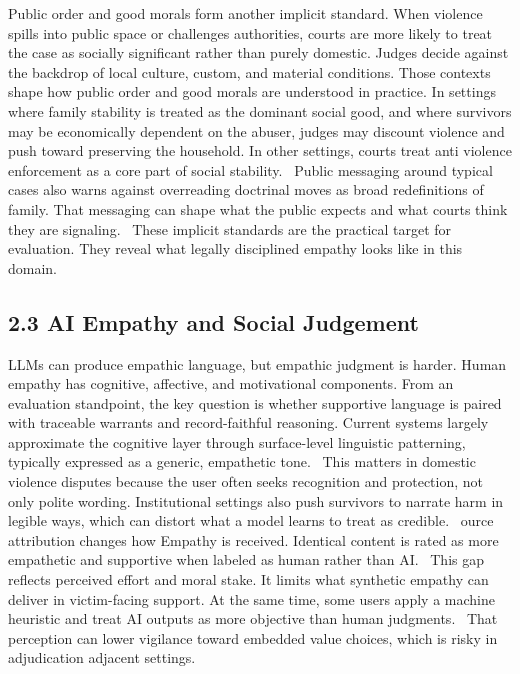 Public order and good morals form another implicit standard. When violence spills into public space or challenges authorities, courts are more likely to treat the case as socially significant rather than purely domestic. Judges decide against the backdrop of local culture, custom, and material conditions. Those contexts shape how public order and good morals are understood in practice. In settings where family stability is treated as the dominant social good, and where survivors may be economically dependent on the abuser, judges may discount violence and push toward preserving the household. In other settings, courts treat anti violence enforcement as a core part of social stability.~\cite{ref71} Public messaging around typical cases also warns against overreading doctrinal moves as broad redefinitions of family. That messaging can shape what the public expects and what courts think they are signaling.~\cite{ref72} These implicit standards are the practical target for evaluation. They reveal what legally disciplined empathy looks like in this domain.

\hypertarget{ai-empathy-and-social-judgement}{%
\subsection{\texorpdfstring{\textbf{2.3 AI Empathy and Social Judgement}}{2.3 AI Empathy and Social Judgement}}\label{ai-empathy-and-social-judgement}}

LLMs can produce empathic language, but empathic judgment is harder. Human empathy has cognitive, affective, and motivational components. From an evaluation standpoint, the key question is whether supportive language is paired with traceable warrants and record-faithful reasoning. Current systems largely approximate the cognitive layer through surface-level linguistic patterning, typically expressed as a generic, empathetic tone.~\cite{ref73} This matters in domestic violence disputes because the user often seeks recognition and protection, not only polite wording. Institutional settings also push survivors to narrate harm in legible ways, which can distort what a model learns to treat as credible.~\cite{ref74} ource attribution changes how Empathy is received. Identical content is rated as more empathetic and supportive when labeled as human rather than AI.~\cite{ref75} This gap reflects perceived effort and moral stake. It limits what synthetic empathy can deliver in victim-facing support. At the same time, some users apply a machine heuristic and treat AI outputs as more objective than human judgments.~\cite{ref76} That perception can lower vigilance toward embedded value choices, which is risky in adjudication adjacent settings.

